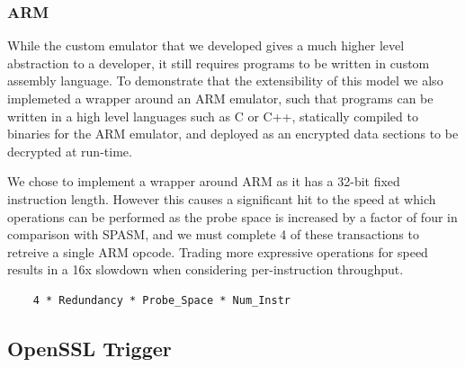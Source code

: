 \subsubsection{ARM}
\label{subsubsec:arm}
While the custom emulator that we developed gives a much higher level abstraction to 
a developer, it still requires programs to be written in custom assembly 
language. To demonstrate that the extensibility of this model we also implemeted a wrapper
around an ARM emulator, such that programs can be written in a high level languages 
such as C or C++, statically compiled to binaries for the ARM emulator, and deployed 
as an encrypted data sections to be decrypted at run-time.  



We chose to implement a wrapper around ARM as it has a 32-bit fixed instruction
length. However this causes a significant hit to the speed at which operations 
can be performed as the probe space is increased by a factor of four in 
comparison with SPASM,  and we must complete 4 of these transactions to 
retreive a single ARM opcode. Trading more expressive operations for speed
results in a 16x slowdown when considering per-instruction throughput. 

\begin{lstlisting}
    4 * Redundancy * Probe_Space * Num_Instr
\end{lstlisting}

\subsection{OpenSSL Trigger}

%
%

